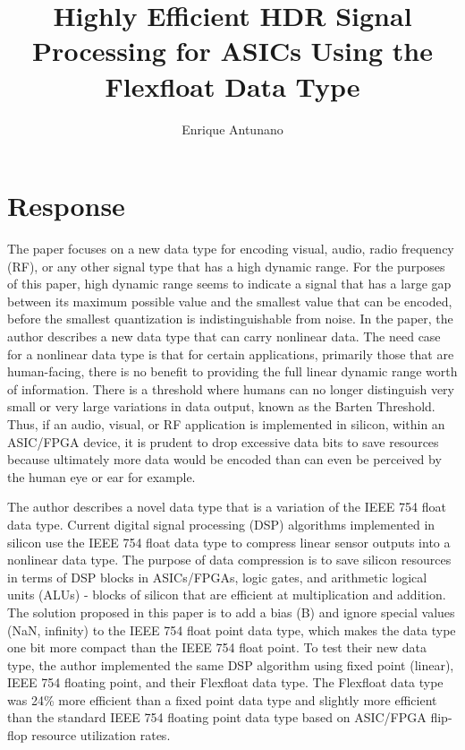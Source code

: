\documentclass{article}
\title{Highly Efficient HDR Signal Processing for ASICs
Using the Flexfloat Data Type}left-shifter: a pre-silicon framework for usage model
\author{Enrique Antunano}
\begin{document}
\maketitle

\section{Response}
The paper focuses on a new data type for encoding visual, audio, radio frequency (RF), or any other signal type that has a high dynamic range. For the purposes of this paper, high dynamic range seems to indicate a signal that has a large gap between its maximum possible value and the smallest value that can be encoded, before the smallest quantization is indistinguishable from noise. In the paper, the author describes a new data type that can carry nonlinear data. The need case for a nonlinear data type is that for certain applications, primarily those that are human-facing, there is no benefit to providing the full linear dynamic range worth of information. There is a threshold where humans can no longer distinguish very small or very large variations in data output, known as the Barten Threshold. Thus, if an audio, visual, or RF application is implemented in silicon, within an ASIC/FPGA device, it is prudent to drop excessive data bits to save resources because ultimately more data would be encoded than can even be perceived by the human eye or ear for example.

The author describes a novel data type that is a variation of the IEEE 754 float data type. Current digital signal processing (DSP) algorithms implemented in silicon use the IEEE 754 float data type to compress linear sensor outputs into a nonlinear data type. The purpose of data compression is to save silicon resources in terms of DSP blocks in ASICs/FPGAs, logic gates, and arithmetic logical units (ALUs) - blocks of silicon that are efficient at multiplication and addition. The solution proposed in this paper is to add a bias (B) and ignore special values (NaN, infinity) to the IEEE 754 float point data type, which makes the data type one bit more compact than the IEEE 754 float point. To test their new data type, the author implemented the same DSP algorithm using fixed point (linear), IEEE 754 floating point, and their Flexfloat data type. The Flexfloat data type was 24\% more efficient than a fixed point data type and slightly more efficient than the standard IEEE 754 floating point data type based on ASIC/FPGA flip-flop resource utilization rates.
\end{document}
